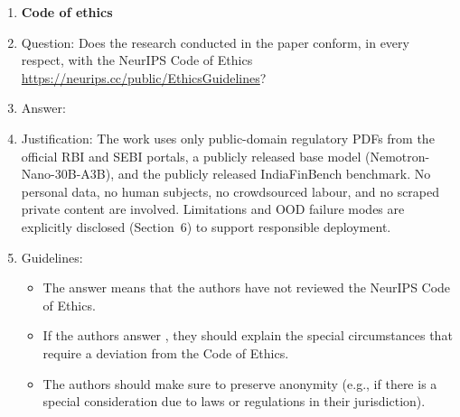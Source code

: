 \begin{enumerate}
\item {\bf Code of ethics}
    \item[] Question: Does the research conducted in the paper conform, in every respect, with the NeurIPS Code of Ethics \url{https://neurips.cc/public/EthicsGuidelines}?
    \item[] Answer: \answerYes{}
    \item[] Justification: The work uses only public-domain regulatory PDFs from the official RBI and SEBI portals, a publicly released base model (Nemotron-Nano-30B-A3B), and the publicly released IndiaFinBench benchmark. No personal data, no human subjects, no crowdsourced labour, and no scraped private content are involved. Limitations and OOD failure modes are explicitly disclosed (Section~6) to support responsible deployment.
    \item[] Guidelines:
    \begin{itemize}
        \item The answer \answerNA{} means that the authors have not reviewed the NeurIPS Code of Ethics.
        \item If the authors answer \answerNo, they should explain the special circumstances that require a deviation from the Code of Ethics.
        \item The authors should make sure to preserve anonymity (e.g., if there is a special consideration due to laws or regulations in their jurisdiction).
    \end{itemize}



\end{enumerate}
